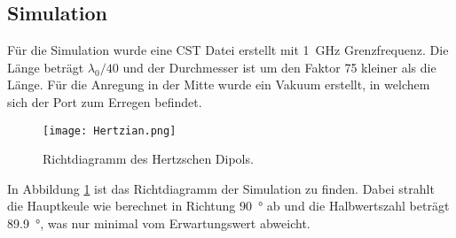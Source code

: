 \subsection{Simulation}

Für die Simulation wurde eine CST Datei erstellt mit \SI{1}{\giga\hertz} Grenzfrequenz. Die Länge beträgt $\lambda_0/40$ und der Durchmesser ist um den Faktor \num{75} kleiner als die Länge. Für die Anregung in der Mitte wurde ein Vakuum erstellt, in welchem sich der Port zum Erregen befindet.

\begin{figure}[!ht]
	\centering
	\texttt{[image: Hertzian.png]}
	\caption{Richtdiagramm des Hertzschen Dipols.}\label{fig:Hertzian}
\end{figure}

In Abbildung \ref{fig:Hertzian} ist das Richtdiagramm der Simulation zu finden. Dabei strahlt die Hauptkeule wie berechnet in Richtung \SI{90}{\degree} ab und die Halbwertszahl beträgt \SI{89.9}{\degree}, was nur minimal vom Erwartungswert abweicht.

